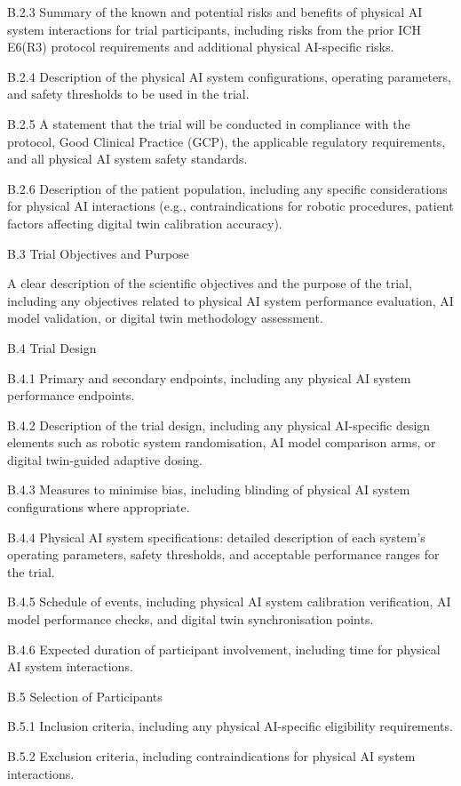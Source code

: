 \documentclass[11pt]{article}
\begin{document}
B.2.3 Summary of the known and potential risks and benefits of physical AI system interactions for trial participants, including risks from the prior ICH E6(R3) protocol requirements and additional physical AI-specific risks.

B.2.4 Description of the physical AI system configurations, operating parameters, and safety thresholds to be used in the trial.

B.2.5 A statement that the trial will be conducted in compliance with the protocol, Good Clinical Practice (GCP), the applicable regulatory requirements, and all physical AI system safety standards.

B.2.6 Description of the patient population, including any specific considerations for physical AI interactions (e.g., contraindications for robotic procedures, patient factors affecting digital twin calibration accuracy).

B.3 Trial Objectives and Purpose

A clear description of the scientific objectives and the purpose of the trial, including any objectives related to physical AI system performance evaluation, AI model validation, or digital twin methodology assessment.

B.4 Trial Design

B.4.1 Primary and secondary endpoints, including any physical AI system performance endpoints.

B.4.2 Description of the trial design, including any physical AI-specific design elements such as robotic system randomisation, AI model comparison arms, or digital twin-guided adaptive dosing.

B.4.3 Measures to minimise bias, including blinding of physical AI system configurations where appropriate.

B.4.4 Physical AI system specifications: detailed description of each system's operating parameters, safety thresholds, and acceptable performance ranges for the trial.

B.4.5 Schedule of events, including physical AI system calibration verification, AI model performance checks, and digital twin synchronisation points.

B.4.6 Expected duration of participant involvement, including time for physical AI system interactions.

B.5 Selection of Participants

B.5.1 Inclusion criteria, including any physical AI-specific eligibility requirements.

B.5.2 Exclusion criteria, including contraindications for physical AI system interactions.
\end{document}
